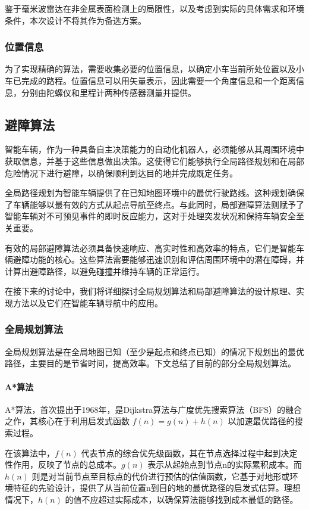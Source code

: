 \documentclass{report}
\begin{document}
鉴于毫米波雷达在非金属表面检测上的局限性，以及考虑到实际的具体需求和环境条件，本次设计不将其作为备选方案\cite{jh2}。

  \subsubsection{位置信息}
  \label{subsec:label}
为了实现精确的算法，需要收集必要的位置信息，以确定小车当前所处位置以及小车已完成的路程。位置信息可以用矢量表示，因此需要一个角度信息和一个距离信息，分别由陀螺仪和里程计两种传感器测量并提供。

\subsection{避障算法}
\label{subsec:label}
智能车辆，作为一种具备自主决策能力的自动化机器人，必须能够从其周围环境中获取信息，并基于这些信息做出决策。这使得它们能够执行全局路径规划和在局部危险情况下进行避障，以确保顺利到达目的地并完成既定任务。

全局路径规划为智能车辆提供了在已知地图环境中的最优行驶路线。这种规划确保了车辆能够以最有效的方式从起点导航至终点。与此同时，局部避障算法则赋予了智能车辆对不可预见事件的即时反应能力，这对于处理突发状况和保持车辆安全至关重要。

有效的局部避障算法必须具备快速响应、高实时性和高效率的特点，它们是智能车辆避障功能的核心。这些算法需要能够迅速识别和评估周围环境中的潜在障碍，并计算出避障路径，以避免碰撞并维持车辆的正常运行。

在接下来的讨论中，我们将详细探讨全局规划算法和局部避障算法的设计原理、实现方法以及它们在智能车辆导航中的应用。

\subsubsection{全局规划算法}
\label{subsec:label}
全局规划算法是在全局地图已知（至少是起点和终点已知）的情况下规划出的最优路径，主要目的是节省时间，提高效率。下文总结了目前的部分全局规划算法。
\paragraph{A*算法}
A*算法，首次提出于1968年，是Dijkstra算法与广度优先搜索算法（BFS）的融合之作，其核心在于利用启发式函数 \( f(n) = g(n) + h(n) \) 以加速最优路径的搜索过程。

在该算法中，\( f(n) \) 代表节点的综合优先级函数，其在节点选择过程中起到决定性作用，反映了节点的总成本。\( g(n) \) 表示从起始点到节点n的实际累积成本。而 \( h(n) \) 则是对当前节点至目标点的代价进行预估的估值函数，它基于对地形或环境特征的先验设计，提供了从当前位置n到目的地的最优路径的启发式估算。理想情况下，\( h(n) \) 的值不应超过实际成本，以确保算法能够找到成本最低的路径。
\end{document}
